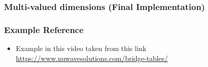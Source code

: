 \begin{frame}
\frametitle{Multi-valued dimensions (Final Implementation)}

\begin{table}
	\caption{Expected output of ArticleSales}
\end{table}

\end{frame}
\begin{frame}
\frametitle{Example Reference}
	\begin{itemize}[<+->]
		\item Example in this video taken from this link \href{https://www.nuwavesolutions.com/bridge-tables/}{https://www.nuwavesolutions.com/bridge-tables/}
	\end{itemize}
\end{frame}



